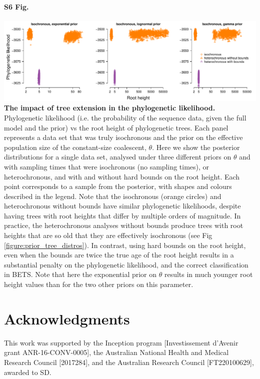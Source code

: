 \documentclass[10pt,letterpaper]{article}
\begin{document}
\paragraph*{S6 Fig.}
\label{S6_Fig}
	\begin{center}
		\includegraphics[width=14cm]{sandbox_figures/tree_extension_likelihood.pdf}\newline
		{\textbf{The impact of tree extension in the phylogenetic likelihood.} Phylogenetic likelihood (i.e. the probability of the sequence data, given the full model and the prior) vs the root height of phylogenetic trees. Each panel represents a data set that was truly isochronous and the prior on the effective population size of the constant-size coalescent, $\theta$. Here we show the posterior distributions for a single data set, analysed under three different priors on $\theta$ and with sampling times that were isochronous (no sampling times), or heterochronous, and with and without hard bounds on the root height. Each point corresponds to a sample from the posterior, with shapes and colours described in the legend. Note that the isochronous (orange circles) and heterochronous without bounds have similar phylogenetic likelihoods, despite having trees with root heights that differ by multiple orders of magnitude. In practice, the heterochronous analyses without bounds produce trees with root heights that are so old that they are effectively isochronous (see Fig \ref{figure:prior_tree_distros}). In contrast, using hard bounds on the root height, even when the bounds are twice the true age of the root height results in a substantial penalty on the phylogenetic likelihood, and the correct classification in BETS. Note that here the exponential prior on $\theta$ results in much younger root height values than for the two other priors on this parameter.}
	\end{center}


\section*{Acknowledgments}
This work was supported by the Inception program [Investissement d’Avenir grant ANR-16-CONV-0005], the Australian National Health and Medical Research Council [2017284], and the Australian Research Council [FT220100629], awarded to SD.
\end{document}
